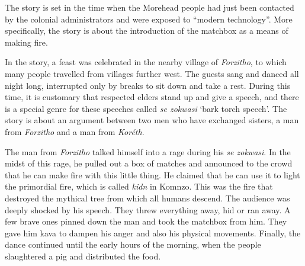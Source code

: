 The story is set in the time when the Morehead people had just been contacted by the colonial administrators and were exposed to ``modern technology''. More specifically, the story is about the introduction of the matchbox as a means of making fire.

In the story, a feast was celebrated in the nearby village of \textit{Forzitho}, to which many people travelled from villages further west. The guests sang and danced all night long, interrupted only by breaks to sit down and take a rest. During this time, it is customary that respected elders stand up and give a speech, and there is a special genre for these speeches called \textit{se zokwasi} `bark torch speech'. The story is about an argument between two men who have exchanged sisters, a man from \textit{Forzitho} and a man from \textit{Koréth}.

The man from \textit{Forzitho} talked himself into a rage during his \textit{se zokwasi}. In the midst of this rage, he pulled out a box of matches and announced to the crowd that he can make fire with this little thing. He claimed that he can use it to light the primordial fire, which is called \textit{kidn} in Komnzo. This was the fire that destroyed the mythical tree from which all humans descend. The audience was deeply shocked by his speech. They threw everything away, hid or ran away. A few brave ones pinned down the man and took the matchbox from him. They gave him kava to dampen his anger and also his physical movements. Finally, the dance continued until the early hours of the morning, when the people slaughtered a pig and distributed the food.